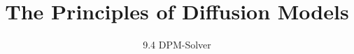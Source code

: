 ﻿%

\title{The Principles of Diffusion Models}
\subtitle{9.4 DPM-Solver}


\begin{frame}
    \titlepage
\end{frame}


